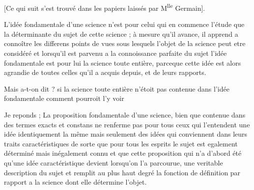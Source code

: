 \documentclass[11pt,a4paper]{article}
\begin{document}

[Ce qui suit s'est trouvé dans les papiers laissés par M\textsuperscript{lle} Germain].

L'idée fondamentale d'une science n'est pour celui qui en commence l'étude que la déterminante du sujet de cette science ; à mesure qu'il avance, il apprend a connoître les differens points de vues sous lesquels l'objet de la science peut etre considéré et lorsqu'il est parvenu a la connoissance parfaite du sujet l'idée fondamentale est pour lui la science toute entière, parceque cette idée est alors agrandie de toutes celles qu'il a acquis depuis, et de leurs rapports.

Mais a-t-on dit ? si la science toute entière n'étoit pas contenue dans l'idée fondamentale comment pourroit  l'y voir

Je reponds ; La proposition fondamentale d'une science, bien que contenue dans des termes exacts et constans ne renferme pas pour tous ceux qui l'entendent une idée identiquement la même mais seulement des idées qui conviennent dans leurs traits caractéristiques de sorte que pour tous les esprits le sujet est egalement déterminé mais inégalement connu et que cette proposition qui n'a d'abord été  qu'une idée caractéristique devient lorsqu'on l'a parcourue, une veritable description du sujet et remplit au plus haut degré la fonction de définition par rapport a la science dont elle détermine l'objet.
\end{document}
